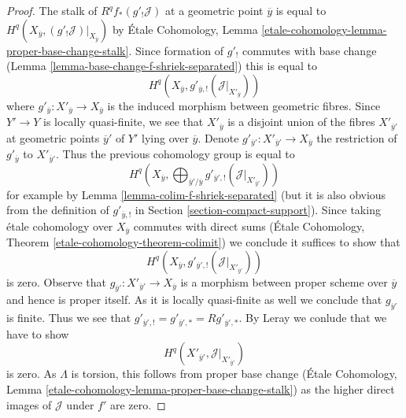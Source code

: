 \documentclass{stacks-project}
\theoremstyle{plain}
\theoremstyle{definition}
\theoremstyle{remark}
\numberwithin{equation}{subsection}
\begin{document}
\begin{proof}
\medskip\noindent
The stalk of $R^qf_*(g'_!\mathcal{J})$ at a geometric point
$\overline{y}$ is equal to
$H^q(X_{\overline{y}}, (g'_!\mathcal{J})|_{X_{\overline{y}}})$ by
\'Etale Cohomology, Lemma
\ref{etale-cohomology-lemma-proper-base-change-stalk}.
Since formation of $g'_!$ commutes with base change
(Lemma \ref{lemma-base-change-f-shriek-separated})
this is equal to
$$
H^q(X_{\overline{y}}, g'_{\overline{y}, !}(\mathcal{J}|_{X'_{\overline{y}}}))
$$
where $g'_{\overline{y}} : X'_{\overline{y}} \to X_{\overline{y}}$
is the induced morphism between geometric fibres.
Since $Y' \to Y$ is locally quasi-finite, we see that
$X'_{\overline{y}}$ is a disjoint union of the fibres
$X'_{\overline{y}'}$ at geometric points $\overline{y}'$ of $Y'$
lying over $\overline{y}$. Denote
$g'_{\overline{y}'} : X'_{\overline{y}'} \to X_{\overline{y}}$
the restriction of $g'_{\overline{y}}$ to $X'_{\overline{y}'}$.
Thus the previous cohomology group is equal to
$$
H^q(X_{\overline{y}},
\bigoplus\nolimits_{\overline{y}'/\overline{y}}
g'_{\overline{y}', !}(\mathcal{J}|_{X'_{\overline{y}'}}))
$$
for example by Lemma \ref{lemma-colim-f-shriek-separated} (but it
is also obvious from the definition of $g'_{\overline{y}, !}$
in Section \ref{section-compact-support}).
Since taking \'etale cohomology over $X_{\overline{y}}$
commutes with direct sums
(\'Etale Cohomology, Theorem \ref{etale-cohomology-theorem-colimit})
we conclude it suffices to show that
$$
H^q(X_{\overline{y}}, g'_{\overline{y}', !}(\mathcal{J}|_{X'_{\overline{y}'}}))
$$
is zero. Observe that
$g_{\overline{y}'} : X'_{\overline{y}'} \to X_{\overline{y}}$
is a morphism between proper scheme over $\overline{y}$ and hence is
proper itself. As it is locally quasi-finite as well we conclude that
$g_{\overline{y}'}$ is finite. Thus we see that
$g'_{\overline{y}', !} = g'_{\overline{y}', *} = Rg'_{\overline{y}', *}$.
By Leray we conlude that we have to show
$$
H^q(X'_{\overline{y}'}, \mathcal{J}|_{X'_{\overline{y}'}})
$$
is zero. As $\Lambda$ is torsion, this follows from proper base change
(\'Etale Cohomology, Lemma
\ref{etale-cohomology-lemma-proper-base-change-stalk})
as the higher direct images of $\mathcal{J}$ under $f'$ are zero.


\end{proof}
\end{document}
